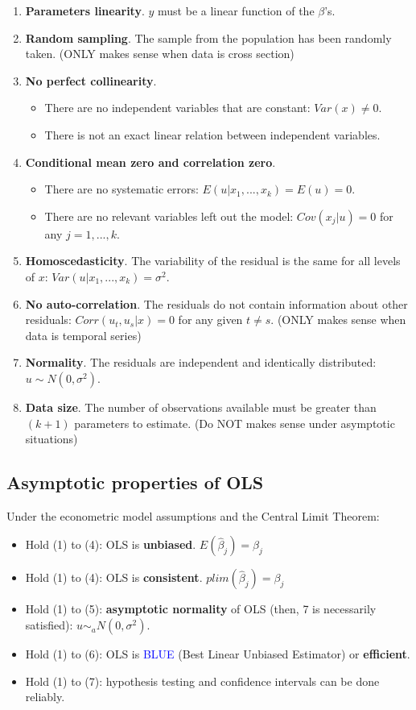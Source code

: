 \documentclass[10pt, a4paper, landscape]{extarticle}
\begin{document}
\begin{multicols}{3}
\begin{enumerate}[leftmargin=*]
\item \textbf{Parameters linearity}. $y$ must be a linear function of the $\beta$'s.
\item \textbf{Random sampling}. The sample from the population has been randomly taken. (ONLY makes sense when data is cross section)
\item \textbf{No perfect collinearity}.
\begin{itemize}[leftmargin=*]
\item There are no independent variables that are constant: $Var(x) \neq 0$.
\item There is not an exact linear relation between independent variables.
\end{itemize}
\item \textbf{Conditional mean zero and correlation zero}.
\begin{itemize}[leftmargin=*]
\item There are no systematic errors: $E(u | x_1, ..., x_k) = E(u) = 0$.
\item There are no relevant variables left out the model: $Cov(x_j | u) = 0$ for any $j = 1, ..., k$.
\end{itemize}
\item \textbf{Homoscedasticity}. The variability of the residual is the same for all levels of $x$: $Var(u | x_1, ..., x_k) = \sigma^2$.
\item \textbf{No auto-correlation}. The residuals do not contain information about other residuals: $Corr(u_t, u_s | x) = 0$ for any given $t \neq s$. (ONLY makes sense when data is temporal series)
\item \textbf{Normality}. The residuals are independent and identically distributed: $u \sim N(0,\sigma^2)$.
\item \textbf{Data size}. The number of observations available must be greater than $(k + 1)$ parameters to estimate. (Do NOT makes sense under asymptotic situations)
\end{enumerate}

\subsection*{Asymptotic properties of OLS}

Under the econometric model assumptions and the Central Limit Theorem:
\begin{itemize}[leftmargin=*]
\item Hold (1) to (4): OLS is \textbf{unbiased}. $E(\hat{\beta}_j) = \beta_j$
\item Hold (1) to (4): OLS is \textbf{consistent}. $plim(\hat{\beta}_j) = \beta_j$
\item Hold (1) to (5): \textbf{asymptotic normality} of OLS (then, 7 is necessarily satisfied): $u \sim_a N(0,\sigma^2)$.
\item Hold (1) to (6): OLS is \textcolor{blue}{BLUE} (Best Linear Unbiased Estimator) or \textbf{efficient}. 
\item Hold (1) to (7): hypothesis testing and confidence intervals can be done reliably.
\end{itemize}


\end{multicols}
\end{document}
